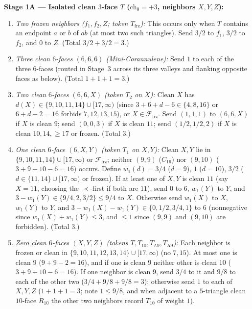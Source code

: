 \documentclass[11pt,reqno]{amsart}
\theoremstyle{plain}
\theoremstyle{definition}
\theoremstyle{remark}
\newcommand{\chz}{\mathrm{ch}_0}
\newcommand{\Ffrz}{\mathcal{F}_{\mathrm{frz}}}
\DeclareRobustCommand{\_}{\ifmmode\text{\textunderscore}\else\textunderscore\allowbreak\fi}
\begin{document}
\medskip
\noindent\textbf{Stage 1A --- Isolated clean $3$-face $T$ ($\chz = +3$, neighbors $X, Y, Z$):}
\begin{enumerate}[label=(T\arabic*),leftmargin=2.8em]
  \item \emph{Two frozen neighbors ($f_1, f_2, Z$; token $T_{\mathrm{frz}}$):} This occurs only when $T$ contains an endpoint $a$ or $b$ of $ab$ (at most two such triangles). Send $3/2$ to $f_1$, $3/2$ to $f_2$, and $0$ to $Z$. (Total $3/2 + 3/2 = 3$.)
  \item \emph{Three clean $6$-faces $(6, 6, 6)$ (Mini-Corannulene):} Send $1$ to each of the three $6$-faces (routed in Stage~3 across its three valleys and flanking opposite faces as below). (Total $1 + 1 + 1 = 3$.)
  \item \emph{Two clean $6$-faces $(6, 6, X)$ (token $T_2$ on $X$):} Clean $X$ has $d(X) \in \{9, 10, 11, 14\} \cup [17, \infty)$ (since $3+6+d-6 \in \{4,8,16\}$ or $6+d-2=16$ forbids $7,12,13,15$), or $X \in \Ffrz$. Send $(1, 1, 1)$ to $(6, 6, X)$ if $X$ is clean $9$; send $(0, 0, 3)$ if $X$ is clean $11$; send $(1/2, 1/2, 2)$ if $X$ is clean $10, 14, \ge 17$ or frozen. (Total $3$.)
  \item \emph{One clean $6$-face $(6, X, Y)$ (token $T_1$ on $X, Y$):} Clean $X, Y$ lie in $\{9, 10, 11, 14\} \cup [17, \infty)$ or $\Ffrz$; neither $(9,9)$ ($C_{16}$) nor $(9,10)$ ($3+9+10-6=16$) occurs. Define $w_1(d) = 3/4$ ($d=9$), $1$ ($d=10$), $3/2$ ($d \in \{11, 14\} \cup [17, \infty)$ or frozen). If at least one of $X, Y$ is clean $11$ (say $X = 11$, choosing the $\prec$-first if both are $11$), send $0$ to $6$, $w_1(Y)$ to $Y$, and $3 - w_1(Y) \in \{9/4, 2, 3/2\} \le 9/4$ to $X$. Otherwise send $w_1(X)$ to $X$, $w_1(Y)$ to $Y$, and $3 - w_1(X) - w_1(Y) \in \{0, 1/2, 3/4, 1\}$ to $6$ (nonnegative since $w_1(X) + w_1(Y) \le 3$, and $\le 1$ since $(9,9)$ and $(9,10)$ are forbidden). (Total $3$.)
  \item \emph{Zero clean $6$-faces $(X, Y, Z)$ (tokens $T, T_{10}, T_{L9}, T_{R9}$):} Each neighbor is frozen or clean in $\{9, 10, 11, 12, 13, 14\} \cup [17, \infty)$ (no $7, 15$). At most one is clean $9$ ($9+9-2=16$), and if one is clean $9$ neither other is clean $10$ ($3+9+10-6=16$). If one neighbor is clean $9$, send $3/4$ to it and $9/8$ to each of the other two ($3/4 + 9/8 + 9/8 = 3$); otherwise send $1$ to each of $X, Y, Z$ ($1 + 1 + 1 = 3$; note $1 \le 9/8$, and when adjacent to a $5$-triangle clean $10$-face $R_{10}$ the other two neighbors record $T_{10}$ of weight $1$).
\end{enumerate}
\end{document}

